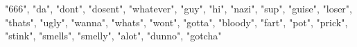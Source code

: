 "666", "da", "dont", "dosent", "whatever", "guy", "hi", "nazi", "sup",
"guise", "loser", "thats", "ugly", "wanna", "whats", "wont", "gotta",
"bloody", "fart", "pot", "prick", "stink", "smells", "smelly", "alot",
"dunno", "gotcha"
